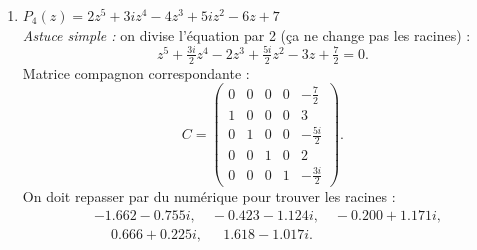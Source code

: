 \begin{solution}
\begin{enumerate}[label=(\alph*)]
    \item $P_4(z) = 2z^5 + 3iz^4 - 4z^3 + 5iz^2 - 6z + 7$ \\
    \emph{Astuce simple :} on divise l’équation par 2 (ça ne change pas les racines) :
    \[
    z^5 + \tfrac{3i}{2}z^4 - 2z^3 + \tfrac{5i}{2}z^2 - 3z + \tfrac{7}{2} = 0.
    \]
    Matrice compagnon correspondante :
    \[
    C =
    \begin{pmatrix}
    0 & 0 & 0 & 0 & -\tfrac{7}{2} \\
    1 & 0 & 0 & 0 & 3 \\
    0 & 1 & 0 & 0 & -\tfrac{5i}{2} \\
    0 & 0 & 1 & 0 & 2 \\
    0 & 0 & 0 & 1 & -\tfrac{3i}{2}
    \end{pmatrix}.
    \]
    On doit repasser par du numérique pour trouver les racines :
    \[
    \begin{aligned}
    &-1.662 - 0.755i,\quad -0.423 - 1.124i,\quad -0.200 + 1.171i,\\
    &\phantom{-}0.666 + 0.225i,\quad \ \ 1.618 - 1.017i.
    \end{aligned}
    \]

\end{enumerate}
\end{solution}
